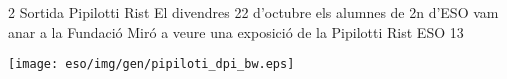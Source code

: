 %
%
\begin{news}
{2} %
{Sortida Pipilotti Rist}
{El divendres 22 d'octubre els alumnes de 2n d'ESO vam anar a la Fundació Miró a veure una exposició de la Pipilotti Rist}
{ESO}
{13} %

\noindent\texttt{[image: eso/img/gen/pipiloti\_dpi\_bw.eps]}






\end{news}
